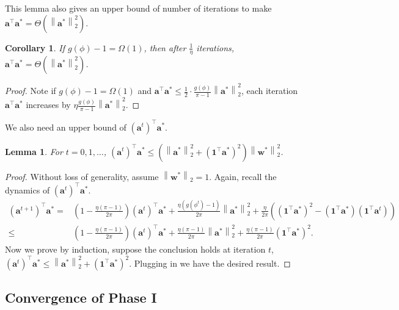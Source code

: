 \documentclass{article}
\newcommand{\firstlayer}{w}
\newcommand{\secondlayer}{a}
\newcommand{\vect}[1]{\mathbf{#1}}
\newcommand{\norm}[1]{\left\|#1\right\|}
\newtheorem{lem}{Lemma}[section]
\newtheorem{cor}{Corollary}[section]
\begin{document}
This lemma also gives an upper bound of number of iterations to make $\vect{\secondlayer}^\top\vect{\secondlayer}^* = \Theta\left(\norm{\vect{\secondlayer}^*}_2^2\right)$.
\begin{cor}\label{cor:inner_prduct_convergences}
If $g(\phi) - 1 = \Omega\left(1\right)$, then after $\frac{1}{\eta}$ iterations, $\vect{\secondlayer}^\top\vect{\secondlayer}^* = \Theta\left(\norm{\vect{\secondlayer}^*}_2^2\right)$.
\end{cor}\begin{proof}
Note if $g(\phi) - 1 = \Omega\left(1\right)$ and $\vect{\secondlayer}^\top \vect{\secondlayer}^* \le \frac{1}{2}\cdot\frac{g(\phi)}{\pi-1}\norm{\vect{\secondlayer}^*}_2^2$, each iteration  $\vect{\secondlayer}^\top \vect{\secondlayer}^*$ increases by $\eta\frac{g(\phi)}{\pi-1}\norm{\vect{\secondlayer}^*}_2^2$. 
\end{proof}We also need an upper bound of $\left(\vect{\secondlayer}^t\right)^\top\vect{\secondlayer}^*$.
\begin{lem}\label{lem:upper_bound_second_layer}
For $t=0,1,\ldots$, $\left(\vect{\secondlayer}^t\right)^\top \vect{\secondlayer}^* \le \left(\norm{\vect{\secondlayer}^*}_2^2+\left(\vect{1}^\top\vect{\secondlayer}^*\right)^2\right)\norm{\vect{\firstlayer}^*}_2^2$.
\end{lem}\begin{proof}
Without loss of generality, assume $\norm{\vect{\firstlayer}^*}_2=1$.
Again, recall the dynamics of $\left(\vect{\secondlayer}^t\right)^\top \vect{\secondlayer}^*$.
\begin{align*}
\left(\vect{\secondlayer}^{t+1}\right)^\top \vect{\secondlayer}^*  = & \left(1-\frac{\eta\left(\pi-1\right)}{2\pi}\right)\left(\vect{\secondlayer}^t\right)^\top \vect{\secondlayer}^* + \frac{\eta\left(g(\phi^t)-1\right)}{2\pi}\norm{\vect{\secondlayer}^*}_2^2 + \frac{\eta}{2\pi}\left(\left(\vect{1}^\top\vect{\secondlayer}^*\right)^2-\left(\vect{1}^\top\vect{\secondlayer}^*\right)\left(\vect{1}^\top \vect{\secondlayer}^t\right)\right) \\
\le & \left(1-\frac{\eta\left(\pi-1\right)}{2\pi}\right)\left(\vect{\secondlayer}^t\right)^\top\vect{\secondlayer}^* + \frac{\eta\left(\pi-1\right)}{2\pi}\norm{\vect{\secondlayer}^*}_2^2 + \frac{\eta\left(\pi-1\right)}{2\pi}\left(\vect{1}^\top\vect{\secondlayer}^*\right)^2.
\end{align*}
Now we prove by induction, suppose the conclusion holds at iteration $t$, $\left(\vect{\secondlayer}^t\right)^\top \vect{\secondlayer}^* \le \norm{\vect{\secondlayer}^*}_2^2+\left(\vect{1}^\top\vect{\secondlayer}^*\right)^2$.
Plugging in we have the desired result.
\end{proof}\subsection{Convergence of Phase I}\label{sec:proof_phase_1}
\end{document}
